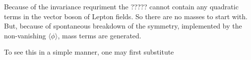 Because of the invariance requriment the ????? cannot contain any quadratic terms in the vector boson of Lepton fields. So there are no masses to start with. But, because of spontaneous breakdown of the symmetry, implemented by the non-vanishing $\langle \phi \rangle$, mass terms are generated.

To see this in a simple manner, one may first substitute








